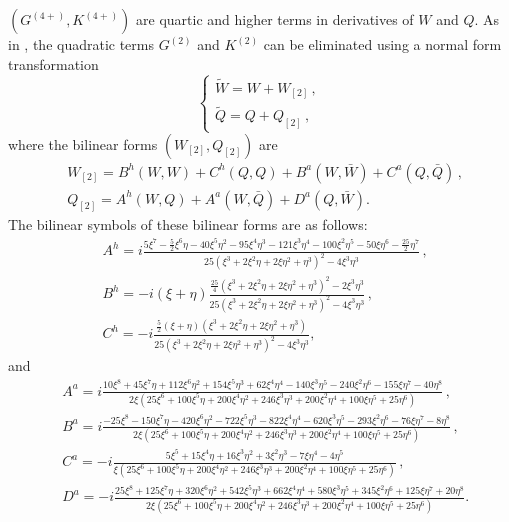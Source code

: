 \documentclass[12pt]{amsart}
\theoremstyle{remark}
\theoremstyle{definition}
\numberwithin{equation}{section}
\newcommand{\f}{\frac}
\begin{document}
$\left(G^{(4+)},K^{(4+)}\right)$ are quartic and higher terms in derivatives of $W$ and $Q$.
As in \cite{MR4846707}, the quadratic terms $G^{(2)}$ and $K^{(2)}$ can be eliminated using a normal form transformation
\begin{equation}\label{NFP1-1}
\begin{cases}
\tilde{W}=W+W_{[2]}\,,\\
\tilde{Q}=Q+Q_{[2]}\,,
\end{cases}
\end{equation}
		where the bilinear forms $(W_{[2]},Q_{[2]})$ are
\begin{equation}\label{NFP1-2}
\begin{aligned}
&W_{[2]}=B^h(W,W)+C^h(Q,Q)+B^a(W,\bar{W})+C^a(Q,\bar{Q})\,,\\
&Q_{[2]}=A^h(W,Q)+A^a(W,\bar{Q})+D^a(Q,\bar{W}).
			\end{aligned}
		\end{equation}
The bilinear symbols of these bilinear forms are as follows:
		\begin{equation*}
			\begin{aligned}
			&A^h=i\f{5\xi^7-\f{5}{2}\xi^6\eta-40\xi^5\eta^2-95\xi^4\eta^3-121\xi^3\eta^4-100\xi^2\eta^5-50\xi\eta^6-\f{25}{2}\eta^7}
				{25(\xi^3+2\xi^2\eta+2\xi\eta^2+\eta^3)^2-4\xi^3\eta^3}\,,\\
				&B^h=-i(\xi+\eta)\f{\f{25}{4}(\xi^3+2\xi^2\eta+2\xi\eta^2+\eta^3)^2-2\xi^3\eta^3}{25(\xi^3+2\xi^2\eta+2\xi\eta^2+\eta^3)^2-4\xi^3\eta^3}\,,\\
				&C^h=-i\f{\f52(\xi+\eta)(\xi^3+2\xi^2\eta+2\xi\eta^2+\eta^3)}{25(\xi^3+2\xi^2\eta+2\xi\eta^2+\eta^3)^2-4\xi^3\eta^3},
			\end{aligned}
		\end{equation*}
		and
\begin{equation*}
\begin{aligned}
&A^a=i\f{10\xi^8+45\xi^7\eta+112\xi^6\eta^2+154\xi^5\eta^3+62\xi^4\eta^4-140\xi^3\eta^5-240\xi^2\eta^6-155\xi\eta^7-40\eta^8}{2\xi(25\xi^6+100\xi^5\eta+200\xi^4\eta^2+246\xi^3\eta^3+200\xi^2\eta^4+100\xi\eta^5+25\eta^6)}\,,\\
&B^a=i\f{-25\xi^8-150\xi^7\eta-420\xi^6\eta^2-722\xi^5\eta^3-822\xi^4\eta^4-620\xi^3\eta^5-293\xi^2\eta^6-76\xi\eta^7-8\eta^8}{2\xi(25\xi^6+100\xi^5\eta+200\xi^4\eta^2+246\xi^3\eta^3+200\xi^2\eta^4+100\xi\eta^5+25\eta^6)}\,,\\
&C^a=-i\f{5\xi^5+15\xi^4\eta+16\xi^3\eta^2+3\xi^2\eta^3-7\xi\eta^4-4\eta^5}
{\xi(25\xi^6+100\xi^5\eta+200\xi^4\eta^2+246\xi^3\eta^3+200\xi^2\eta^4+100\xi\eta^5+25\eta^6)}\,,\\
&D^a=-i\f{25\xi^8+125\xi^7\eta+320\xi^6\eta^2+542\xi^5\eta^3+662\xi^4\eta^4+580\xi^3\eta^5+345\xi^2\eta^6+125\xi\eta^7+20\eta^8}
{2\xi(25\xi^6+100\xi^5\eta+200\xi^4\eta^2+246\xi^3\eta^3+200\xi^2\eta^4+100\xi\eta^5+25\eta^6)}.
\end{aligned}
\end{equation*}
\end{document}
